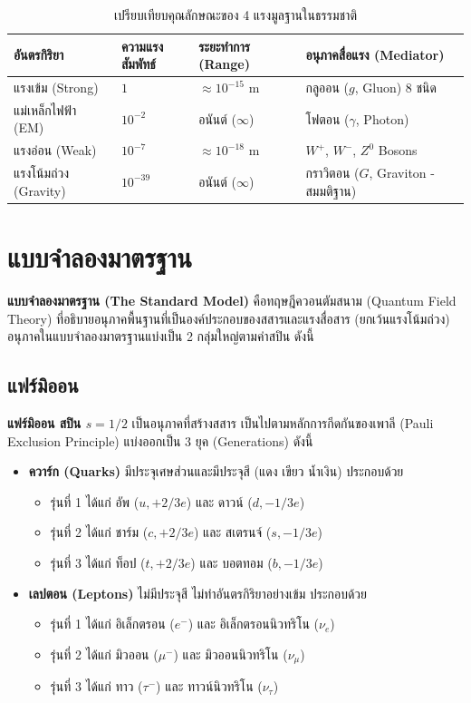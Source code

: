 \begin{table}[H]
\centering
\caption{เปรียบเทียบคุณลักษณะของ 4 แรงมูลฐานในธรรมชาติ}
\label{tab:four_fundamental_forces}
\begin{tabularx}{\textwidth}{l Z Z Y}
\toprule
\textbf{อันตรกิริยา} & \textbf{ความแรงสัมพัทธ์} & \textbf{ระยะทำการ (Range)} & \textbf{อนุภาคสื่อแรง (Mediator)} \\
\midrule
แรงเข้ม (Strong) & $1$ & $\approx 10^{-15}\text{ m}$ & กลูออน ($g$, Gluon) 8 ชนิด \\
แม่เหล็กไฟฟ้า (EM) & $10^{-2}$ & อนันต์ ($\infty$) & โฟตอน ($\gamma$, Photon) \\
แรงอ่อน (Weak) & $10^{-7}$ & $\approx 10^{-18}\text{ m}$ & $W^+$, $W^-$, $Z^0$ Bosons \\
แรงโน้มถ่วง (Gravity) & $10^{-39}$ & อนันต์ ($\infty$) & กราวิตอน ($G$, Graviton - สมมติฐาน) \\
\bottomrule
\end{tabularx}
\end{table}

\section{แบบจำลองมาตรฐาน}

\textbf{แบบจำลองมาตรฐาน (The Standard Model)} คือทฤษฎีควอนตัมสนาม (Quantum Field Theory) ที่อธิบายอนุภาคพื้นฐานที่เป็นองค์ประกอบของสสารและแรงสื่อสาร (ยกเว้นแรงโน้มถ่วง) อนุภาคในแบบจำลองมาตรฐานแบ่งเป็น 2 กลุ่มใหญ่ตามค่าสปิน ดังนี้

\subsection{แฟร์มิออน}
\textbf{แฟร์มิออน สปิน $s = 1/2$} เป็นอนุภาคที่สร้างสสาร เป็นไปตามหลักการกีดกันของเพาลี (Pauli Exclusion Principle) แบ่งออกเป็น 3 ยุค (Generations) ดังนี้
\begin{itemize}
    \item \textbf{ควาร์ก (Quarks)} มีประจุเศษส่วนและมีประจุสี (แดง เขียว น้ำเงิน) ประกอบด้วย
    \begin{itemize}
        \item รุ่นที่ 1 ได้แก่ อัพ ($u, +2/3e$) และ ดาวน์ ($d, -1/3e$)
        \item รุ่นที่ 2 ได้แก่ ชาร์ม ($c, +2/3e$) และ สเตรนจ์ ($s, -1/3e$)
        \item รุ่นที่ 3 ได้แก่ ท็อป ($t, +2/3e$) และ บอตทอม ($b, -1/3e$)
    \end{itemize}
    \item \textbf{เลปตอน (Leptons)} ไม่มีประจุสี ไม่ทำอันตรกิริยาอย่างเข้ม ประกอบด้วย
    \begin{itemize}
        \item รุ่นที่ 1 ได้แก่ อิเล็กตรอน ($e^-$) และ อิเล็กตรอนนิวทริโน ($\nu_e$)
        \item รุ่นที่ 2 ได้แก่ มิวออน ($\mu^-$) และ มิวออนนิวทริโน ($\nu_\mu$)
        \item รุ่นที่ 3 ได้แก่ ทาว ($\tau^-$) และ ทาวน์นิวทริโน ($\nu_\tau$)
    \end{itemize}
\end{itemize}

